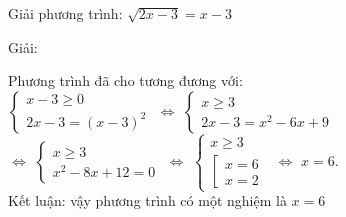       
          \begin{vd}
            Giải phương trình: $ \sqrt{2x-3} = x-3 $

          \end{vd}
          \begin{center}

            Giải:
         \end{center}
          Phương trình đã cho tương đương với: \\
         $
            \begin{cases}
                x - 3 \geq 0 \\
                2x- 3 = (x-3)^2
            \end{cases}
          $ 
        $    \Leftrightarrow $
          $
            \begin{cases}
                x \geq 3 \\
                2x - 3 = x^2 -6x +9
            \end{cases}
          $ \\
        $    \Leftrightarrow $
         $
            \begin{cases}
                x  \geq 3 \\
                x^2 - 8x + 12 =0
            \end{cases}
          $ 
        $    \Leftrightarrow $
         $
            \begin{cases}
                x  \geq 3 \\
                \left[ \begin{array} {l}
                    x=6 \\ 
                    x=2
                  \end{array}
                \right.
                
            \end{cases}
          $ 
        $    \Leftrightarrow $
        $
            x=6.
        $
         \\        
         Kết luận: vậy phương trình có một nghiệm là $x=6$
